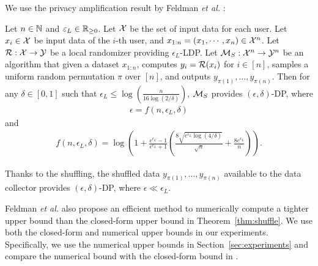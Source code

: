 We use the privacy amplification result by Feldman \textit{et al.} \cite{Feldman_FOCS21}:
\begin{theorem}  \label{thm:shuffle}
Let $n \in \mathbb{N}$ and $\varepsilon_L \in \mathbb{R}_{\ge0}$. 
Let $\mathcal{X}$ be the set of input data for each user. 
Let $x_i \in \mathcal{X}$ be input data of the $i$-th user, and 
$x_{1:n} = (x_1, \cdots, x_n) \in \mathcal{X}^n$. 
Let $\mathcal{R}: \mathcal{X} \rightarrow \mathcal{Y}$ be a local randomizer providing $\epsilon_L$-LDP. 
Let $\mathcal{M}_S: \mathcal{X}^n \rightarrow \mathcal{Y}^n$ be an algorithm that given a dataset $x_{1:n}$, computes $y_i = \mathcal{R}(x_i)$ for $i \in [n]$, samples a uniform random permutation $\pi$ over $[n]$, and outputs $y_{\pi(1)}, \ldots, y_{\pi(n)}$. 
Then for any $\delta \in [0,1]$ such that $\epsilon_L \leq \log (\frac{n}{16 \log (2/\delta)})$, $\mathcal{M}_S$ provides $(\epsilon, \delta)$-DP, where
\begin{align}
\epsilon = f(n, \epsilon_L, \delta)
\label{eq:shuffle_epsilon_f}
\end{align}
and 
\begin{align}
f(n, \epsilon_L, \delta) = \log \left( 1 + \frac{e^{\epsilon_L}-1}{e^{\epsilon_L}+1} \left( \frac{8\sqrt{e^{\epsilon_L} \log(4/\delta)}}{\sqrt{n}} + \frac{8 e^{\epsilon_L}}{n} \right) \right).
\label{eq:shuffle_epsilon}
\end{align}
\end{theorem}
Thanks to the shuffling, the shuffled data $y_{\pi(1)}, \ldots, y_{\pi(n)}$ available to the data collector provides $(\epsilon, \delta)$-DP, where $\epsilon \ll \epsilon_L$. 

Feldman \textit{et al.} \cite{Feldman_FOCS21} also propose an efficient method to numerically compute a tighter upper bound than the closed-form upper bound in Theorem~\ref{thm:shuffle}. 
We use both the closed-form and numerical upper bounds in our experiments. 
Specifically, we use the numerical upper bounds in Section~\ref{sec:experiments} and compare the numerical bound with the closed-form bound in 
. 

